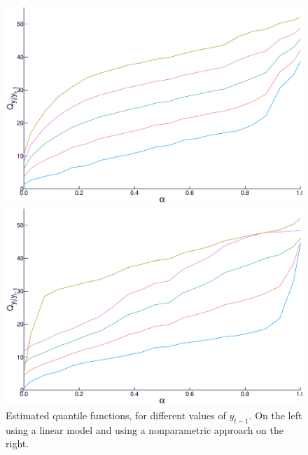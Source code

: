 \begin{figure}
  \centering
  \begin{minipage}[t]{\linewidth}
    \centering
    \begin{minipage}[t]{0.45\linewidth}
      \centering     \includegraphics[width=\textwidth]{Figuras/regressao-quantilica/icaraizinho-quantile-linear}
    \end{minipage}
    \begin{minipage}[t]{0.45\linewidth}
      \centering     \includegraphics[width=\textwidth]{Figuras/regressao-quantilica/icaraizinho-quantile-nonpar-lambda30}
    \end{minipage}
  \end{minipage}
  \caption{Estimated quantile functions, for different values of $y_{t-1}$. On the left using a linear model and using a nonparametric approach on the right.}
  \label{fig:quantiles-vs-xt}
\end{figure}

